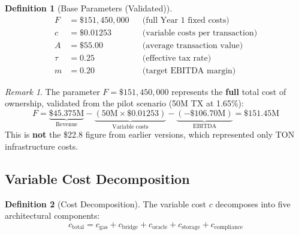 \documentclass[12pt,a4paper]{article}
\theoremstyle{definition}
\newtheorem{definition}{Definition}[section]
\theoremstyle{remark}
\newtheorem{remark}{Remark}[section]
\newcommand{\USD}[1]{\$#1}
\begin{document}
\begin{definition}[Base Parameters (Validated)]
\label{def:base-params}
\begin{align*}
F &= \USD{151{,}450{,}000} && \text{(full Year 1 fixed costs)} \\
c &= \USD{0.01253} && \text{(variable costs per transaction)} \\
A &= \USD{55.00} && \text{(average transaction value)} \\
\tau &= 0.25 && \text{(effective tax rate)} \\
m &= 0.20 && \text{(target EBITDA margin)}
\end{align*}
\end{definition}

\begin{remark}
The parameter $F = \USD{151{,}450{,}000}$ represents the \textbf{full} total cost of ownership, validated from the pilot scenario (50M TX at 1.65\%):
\begin{equation}
F = \underbrace{\USD{45.375\text{M}}}_{\text{Revenue}} - \underbrace{(50\text{M} \times \USD{0.01253})}_{\text{Variable costs}} - \underbrace{(-\USD{106.70\text{M}})}_{\text{EBITDA}} = \USD{151.45\text{M}}
\end{equation}
This is \textbf{not} the \USD{22.8} figure from earlier versions, which represented only TON infrastructure costs.
\end{remark}

\subsection{Variable Cost Decomposition}

\begin{definition}[Cost Decomposition]
The variable cost $c$ decomposes into five architectural components:
\begin{equation}
\label{eq:cost-decomposition}
c_{\text{total}} = c_{\text{gas}} + c_{\text{bridge}} + c_{\text{oracle}} + c_{\text{storage}} + c_{\text{compliance}}
\end{equation}
\end{definition}
\end{document}
